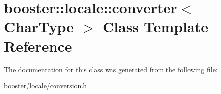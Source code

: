 \section{booster\-:\-:locale\-:\-:converter$<$ Char\-Type $>$ Class Template Reference}
\label{classbooster_1_1locale_1_1converter}


The documentation for this class was generated from the following file\-:\begin{DoxyCompactItemize}
\item 
booster/locale/conversion.\-h\end{DoxyCompactItemize}
